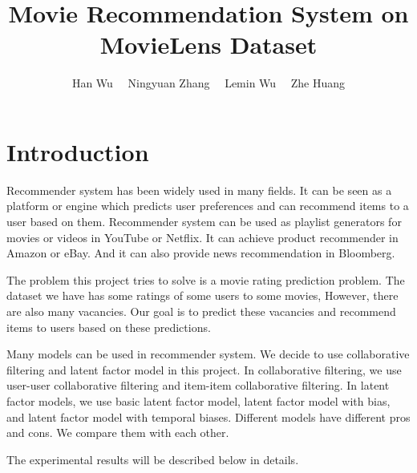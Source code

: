 \documentclass[sigconf]{acmart}
\begin{document}
\title{Movie Recommendation System on MovieLens Dataset}

\author{Han Wu \ \ Ningyuan Zhang \ \ Lemin Wu \ \ Zhe Huang}


\maketitle

\section{Introduction}
Recommender system has been widely used in many fields. It can be seen as a platform or engine which predicts user preferences and can recommend items to a user based on them. Recommender system can be used as playlist generators for movies or videos in YouTube or Netflix. It can achieve product recommender in Amazon or eBay. And it can also provide news recommendation in Bloomberg.

The problem this project tries to solve is a movie rating prediction problem. The dataset we have has some ratings of some users to some movies, However, there are also many vacancies. Our goal is to predict these vacancies and recommend items to users based on these predictions. 

Many models can be used in recommender system. We decide to use collaborative filtering and latent factor model in this project. In collaborative filtering, we use user-user collaborative filtering and item-item collaborative filtering. In latent factor models, we use basic latent factor model, latent factor model with bias, and latent factor model with temporal biases. Different models have different pros and cons. We compare them with each other.

The experimental results will be described below in details.
\end{document}
